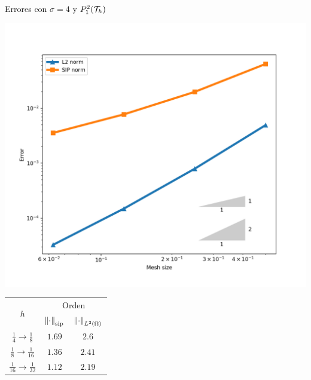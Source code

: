 		\begin{frame}{Errores con $\sigma=4$ y $\relax{P}^2_1(\mathcal{T}_h)$}
		\begin{minipage}{0.50\textwidth}
			\centering
			\includegraphics[scale=0.30]{img/Difusion/errores_difusion_P1dc.png}
		\end{minipage}
		\begin{minipage}{0.49\textwidth}
			\centering
			\begin{tabular}{|c|c|c|}
				\hline 
				\multirow{2}{*}{$h$} & \multicolumn{2}{c|}{Orden} \\
				\cline{2-3}
				&  $\left\|\cdot\right\|_{\text{sip}}$ & $\left\|\cdot\right\|_{L^2(\Omega)}$ \\ 
				\hline
				\hline
				$\frac{1}{4}\to\frac{1}{8}$ & $1.69$ & $2.6$ \\ 
				\hline 
				$\frac{1}{8}\to\frac{1}{16}$ & $1.36$ & $2.41$ \\ 
				\hline 
				$\frac{1}{16}\to\frac{1}{32}$ & $1.12$ & $2.19$\\
				\hline
			\end{tabular}
		\end{minipage}
		\end{frame}
		
